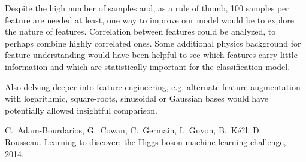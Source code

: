 \documentclass[10pt,conference,compsocconf]{IEEEtran}
\begin{document}
Despite the high number of samples and, as a rule of thumb, 100 samples per feature are needed at least, one way to improve our model would be to explore the nature of features. Correlation between features could be analyzed, to perhaps combine highly correlated ones. Some additional physics background for feature understanding would have been helpful to see which features carry little information and which are statistically important for the classification model.

Also delving deeper into feature engineering, e.g. alternate feature augmentation with logarithmic, square-roots, sinusoidal or Gaussian bases would have potentially allowed insightful comparison.

\begin{thebibliography}{}
C.~Adam-Bourdarios, G.~Cowan, C.~Germain, I.~Guyon, B.~K\'{e}?l, D. ~ Rousseau.
Learning to discover: the Higgs boson machine learning challenge, 2014.
\end{thebibliography}
\end{document}
